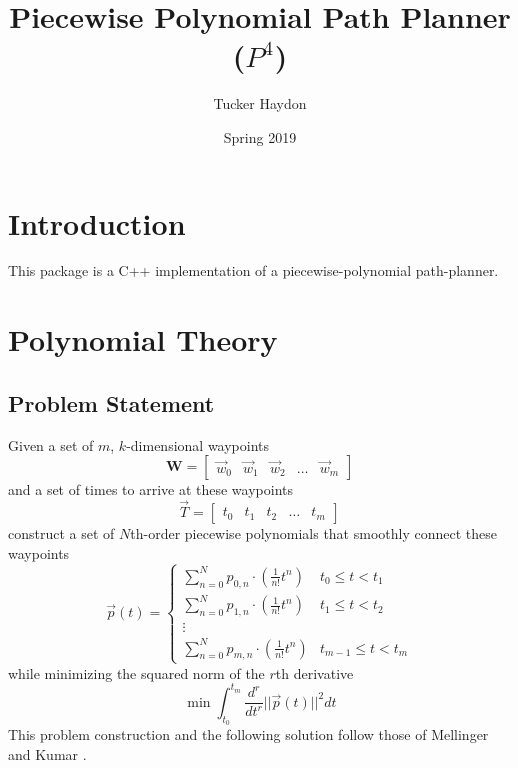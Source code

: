 \documentclass[12pt]{article}
\title{Piecewise Polynomial Path Planner ($P^4$)}
\author{Tucker Haydon}
\date{Spring 2019}
\begin{document}
\maketitle

\section{Introduction}
This package is a C++ implementation of a piecewise-polynomial path-planner.

\section{Polynomial Theory}
\subsection{Problem Statement}
Given a set of $m$, $k$-dimensional waypoints 
%
\begin{equation}
  \mathbf{W} = 
  \begin{bmatrix}
    \vec{w}_{0} & \vec{w}_{1} & \vec{w}_{2} & \hdots & \vec{w}_{m}
  \end{bmatrix}
\end{equation}
%
and a set of times to arrive at these waypoints 
\begin{equation}
  \vec{T} = 
  \begin{bmatrix}
    t_{0} & t_{1} & t_{2} & \hdots & t_{m}
  \end{bmatrix}
\end{equation}
%
construct a set of $N$th-order piecewise polynomials that smoothly connect these waypoints
%
\begin{equation}
  \vec{p}(t) = 
  \begin{cases}
    \sum_{n=0}^{N} p_{0,n} \cdot (\frac{1}{n!} t^{n}) & t_{0} \leq t < t_{1} \\ 
    \sum_{n=0}^{N} p_{1,n} \cdot (\frac{1}{n!} t^{n}) & t_{1} \leq t < t_{2} \\ 
    \vdots \\
    \sum_{n=0}^{N} p_{m,n} \cdot (\frac{1}{n!} t^{n}) & t_{m-1} \leq t < t_{m}
  \end{cases}
\end{equation}
%
while minimizing the squared norm of the $r$th derivative
%
\begin{equation}
  \min
  \int_{t_{0}}^{t_{m}} \frac{d^{r}}{dt^{r}}|| \vec{p}(t) ||^{2} dt
\end{equation}
%
This problem construction and the following solution follow those of Mellinger
and Kumar \cite{mellinger2011minimum}.
\end{document}
